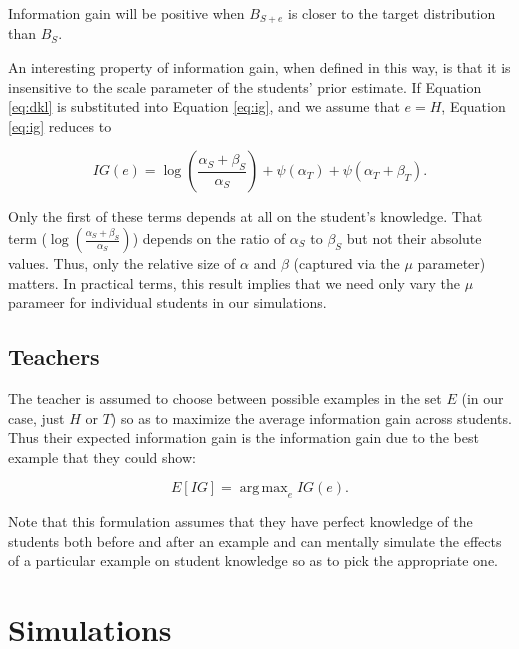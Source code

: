 \documentclass[10pt,letterpaper]{article}
\DeclareMathOperator*{\argmax}{arg\,max}
\begin{document}
\noindent Information gain will be positive when $B_{S+e}$ is closer to the target distribution than $B_S$.

An interesting property of information gain, when defined in this way, is that it is insensitive to the scale parameter of the students' prior estimate. If Equation \ref{eq:dkl} is substituted into Equation \ref{eq:ig}, and we assume that $e=H$, Equation \ref{eq:ig} reduces to

\begin{equation}
IG(e) = \log(\frac{\alpha_S + \beta_S}{\alpha_S}) + \psi (\alpha_T) + \psi (\alpha_T + \beta_T).
\end{equation}

\noindent Only the first of these terms depends at all on the student's knowledge. That term ($\log(\frac{\alpha_S + \beta_S}{\alpha_S})$) depends on the ratio of $\alpha_S$ to $\beta_S$ but not their absolute values. Thus, only the relative size of $\alpha$ and $\beta$ (captured via the $\mu$ parameter) matters. In practical terms, this result implies that we need only vary the $\mu$ parameer for individual students in our simulations.

\subsection{Teachers}

The teacher is assumed to choose between possible examples in the set $E$ (in our case, just $H$ or $T$) so as to maximize the average information gain across students. Thus their expected information gain is the information gain due to the best example that they could show:

\begin{equation}
E[IG] = \argmax_e {IG(e)}.
\end{equation}

\noindent Note that this formulation assumes that they have perfect knowledge of the students both before and after an example and can mentally simulate the effects of a particular example on student knowledge so as to pick the appropriate one. 

 \section{Simulations}
\end{document}
